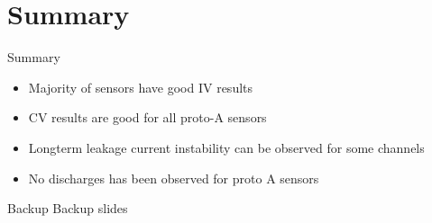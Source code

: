 \documentclass{beamer}
\begin{document}


\section{Summary}
\begin{frame}{Summary}
  \begin{itemize}
    \item Majority of sensors have good IV results
    \item CV results are good for all proto-A sensors
    \item Longterm leakage current instability can be observed  for some channels
    \item No discharges has been observed for proto A sensors
  \end{itemize}
\end{frame}

\appendix

\begin{frame}{Backup}
	\center
	\huge
	Backup slides
\end{frame}
\end{document}
